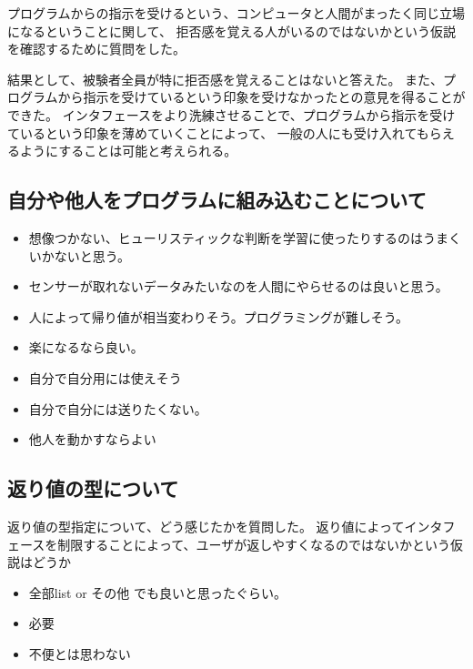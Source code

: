 プログラムからの指示を受けるという、コンピュータと人間がまったく同じ立場になるということに関して、
拒否感を覚える人がいるのではないかという仮説を確認するために質問をした。

結果として、被験者全員が特に拒否感を覚えることはないと答えた。
また、プログラムから指示を受けているという印象を受けなかったとの意見を得ることができた。
インタフェースをより洗練させることで、プログラムから指示を受けているという印象を薄めていくことによって、
一般の人にも受け入れてもらえるようにすることは可能と考えられる。

\subsection{自分や他人をプログラムに組み込むことについて}\label{ux81eaux5206ux3084ux4ed6ux4ebaux3092ux30d7ux30edux30b0ux30e9ux30e0ux306bux7d44ux307fux8fbcux3080ux3053ux3068ux306bux3064ux3044ux3066}

\begin{itemize}
\item
  想像つかない、ヒューリスティックな判断を学習に使ったりするのはうまくいかないと思う。
\item
  センサーが取れないデータみたいなのを人間にやらせるのは良いと思う。
\item
  人によって帰り値が相当変わりそう。プログラミングが難しそう。
\item
  楽になるなら良い。
\item
  自分で自分用には使えそう
\item
  自分で自分には送りたくない。
\item
  他人を動かすならよい
\end{itemize}

\subsection{返り値の型について}\label{ux8fd4ux308aux5024ux306eux578bux306bux3064ux3044ux3066}

返り値の型指定について、どう感じたかを質問した。
返り値によってインタフェースを制限することによって、ユーザが返しやすくなるのではないかという仮説はどうか

\begin{itemize}
\itemsep1pt\parskip0pt
\item
  全部list or その他 でも良いと思ったぐらい。
\item
  必要
\item
  不便とは思わない
\end{itemize}

